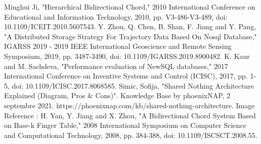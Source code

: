 \documentclass{article}
\begin{document}
\pagebreak

\begin{thebibliography}{9}
Minghui Ji, "Hierarchical Bidirectional Chord," 2010 International Conference on Educational and Information Technology, 2010, pp. V3-486-V3-489, doi: 10.1109/ICEIT.2010.5607543.
Y. Zhou, Q. Chen, B. Shan, F. Jiang and Y. Pang, "A Distributed Storage Strategy For Trajectory Data Based On Nosql Database," IGARSS 2019 - 2019 IEEE International Geoscience and Remote Sensing Symposium, 2019, pp. 3487-3490, doi: 10.1109/IGARSS.2019.8900482.
K. Kaur and M. Sachdeva, "Performance evaluation of NewSQL databases," 2017 International Conference on Inventive Systems and Control (ICISC), 2017, pp. 1-5, doi: 10.1109/ICISC.2017.8068585.
Simic, Sofija, "Shared Nothing Architecture Explained (Diagram, Pros \& Cons)". Knowledge Base by phoenixNAP, 2 septembre 2021. https://phoenixnap.com/kb/shared-nothing-architecture.
Image Reference : H. Yan, Y. Jiang and X. Zhou, "A Bidirectional Chord System Based on Base-k Finger Table," 2008 International Symposium on Computer Science and Computational Technology, 2008, pp. 384-388, doi: 10.1109/ISCSCT.2008.55.
\end{thebibliography}

\pagebreak

\appendix
\end{document}
